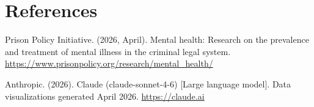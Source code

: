\documentclass[
]{article}
\begin{document}
\newpage

\section{References}\label{references}

Prison Policy Initiative. (2026, April). Mental health: Research on the
prevalence and treatment of mental illness in the criminal legal system.
\url{https://www.prisonpolicy.org/research/mental_health/}

Anthropic. (2026). Claude (claude-sonnet-4-6) {[}Large language
model{]}. Data visualizations generated April 2026.
\url{https://claude.ai}
\end{document}
